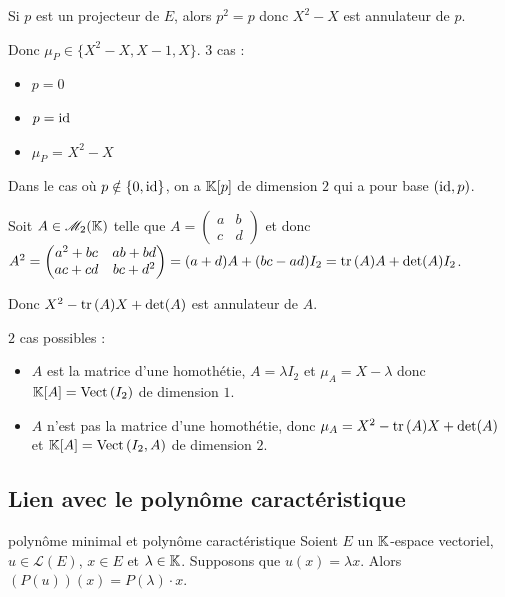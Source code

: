 \begin{exemple}
    Si $p$ est un projecteur de $E$, alors $p^2 = p$ donc $X^2 - X$ est annulateur de $p$.

    Donc $\mu_P \in \{X^2 - X, X - 1, X\}$. 3 cas : 
    \begin{itemize}
        \item $p = 0$
        \item $p = \operatorname{id}$
        \item $\mu_P$ = $X^2 - X$ 
    \end{itemize}

    Dans le cas où $p \notin \{0, \operatorname{id}\}$, on a $\mathbb{K}[p]$ de dimension $2$ qui a pour base $(\operatorname{id}, p)$.

    \lvspace Soit $A \in \mathscr M_2(\mathbb{K})$ telle que $A = \begin{pmatrix}
        a & b \\
        c & d
    \end{pmatrix}$ et donc $A^2 = \begin{pmatrix}
        a^2 + bc & ab + bd \\
        ac + cd & bc + d^2
    \end{pmatrix} = (a + d) A  + (b c - ad) I_2 = \operatorname{tr} \,(A) A + \det(A) I_2$.

    Donc $X^2 - \operatorname{tr} \,(A) X + \det(A)$ est annulateur de $A$.

    $2$ cas possibles : 
    \begin{itemize}
        \item $A$ est la matrice d'une homothétie, $A = \lambda I_2$ et $\mu_A = X - \lambda$ donc 
        $\mathbb{K}[A] = \operatorname{Vect} \,(I_2)$ de dimension $1$.
        \item $A$ n'est pas la matrice d'une homothétie, donc $\mu_A = X^2 - \operatorname{tr} \,(A) X + \det(A)$ et 
        $\mathbb{K}[A] = \operatorname{Vect} \,(I_2, A)$ de dimension $2$.
    \end{itemize}
\end{exemple}

\subsection{Lien avec le polynôme caractéristique}

\begin{proposition}{polynôme minimal et polynôme caractéristique}{}
    Soient $E$ un $\mathbb{K}$-espace vectoriel, $u \in \mathscr L(E)$, $x \in E$ et 
    $\lambda \in \mathbb{K}$. Supposons que $u(x) = \lambda x$. Alors $(P(u))(x) = P(\lambda)\cdot x$.
\end{proposition}

